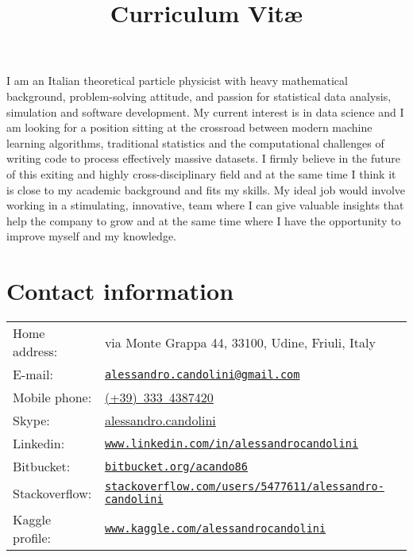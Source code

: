 \documentclass[10pt,a4paper]{moderncv}   %
\title{%
 Curriculum Vit\ae
}
\makeatletter
\newenvironment{mycvline}{
      \begin{tabular*}{\textwidth}{ R{\hintscolumnwidth}
	    @{\extracolsep{\columnsep}}l}
   }{
\end{tabular*}
}
\newcommand{\mail}[1]{\href{mailto:#1}{\texttt{#1}}}
\newcommand{\website}[2]{\href{#1#2}{\texttt{#2}}}
\newcommand{\skype}[1]{\href{skype:#1?userinfo}{#1}}%
\makeatother
\begin{document}
\makecvtitle

   


I am an Italian theoretical particle physicist with heavy mathematical
background, problem-solving attitude, and passion for statistical data
analysis, simulation and software development.
My current interest is in data science and I am looking for a position sitting at the crossroad
between 
modern machine learning algorithms, traditional statistics and the computational
challenges of writing code to process effectively massive datasets. 
I firmly believe in the future of this exiting and highly cross-disciplinary field and at the same time I think it is
close to my academic background  and fits my skills. 
My ideal job would involve working in a stimulating, innovative,
team where I can give
valuable insights that help the 
company to grow  and at the same time where I have the opportunity  to
improve myself and my knowledge.


\section{Contact information}

\begin{mycvline}
     Home address: & via Monte Grappa 44, 33100, Udine, Friuli, Italy  \\
      E-mail: & \mail{alessandro.candolini@gmail.com} \\
    Mobile phone: & 
    \href{tel:00393334387420}{(+39)~333~4387420}\\
    Skype: & \skype{alessandro.candolini} \\
    Linkedin: & \website{https://}{www.linkedin.com/in/alessandrocandolini}  \\
    Bitbucket:  & \website{https://}{bitbucket.org/acando86} \\
    Stackoverflow:  & 
   \website{http://}{stackoverflow.com/users/5477611/alessandro-candolini} \\
    Kaggle profile:  & \website{http://}{www.kaggle.com/alessandrocandolini}
\end{mycvline}
\end{document}
